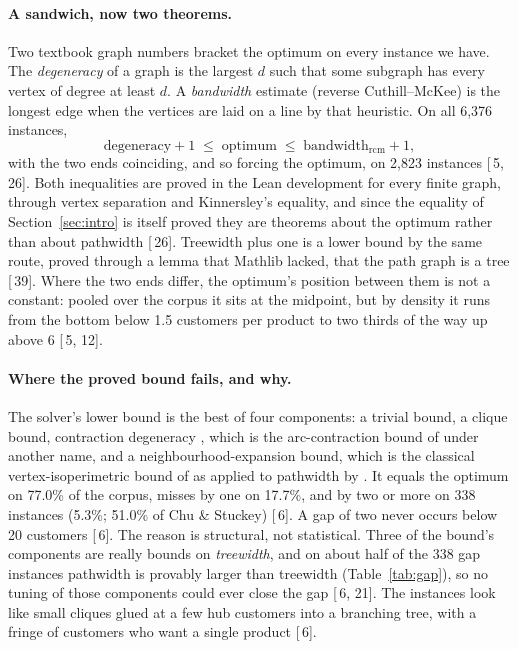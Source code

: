 \documentclass[11pt,a4paper]{article}
\renewcommand{\S}[1]{[\textsection\,#1]}
\begin{document}
\paragraph{A sandwich, now two theorems.}
Two textbook graph numbers bracket the optimum on every instance we have.
The \emph{degeneracy} of a graph is the largest $d$ such that some subgraph
has every vertex of degree at least $d$. A \emph{bandwidth} estimate
(reverse Cuthill--McKee) is the longest edge when the vertices are laid on a
line by that heuristic. On all 6,376 instances,
\[
\text{degeneracy} + 1 \;\le\; \text{optimum} \;\le\; \text{bandwidth}_{\mathrm{rcm}} + 1,
\]
with the two ends coinciding, and so forcing the optimum, on 2,823 instances
\S{5, 26}. Both inequalities are proved in the Lean development for every
finite graph, through vertex separation and Kinnersley's equality, and since
the equality of Section~\ref{sec:intro} is itself proved they are theorems
about the optimum rather than about pathwidth \S{26}. Treewidth plus one is
a lower bound by the same route, proved through a lemma that Mathlib lacked,
that the path graph is a tree \S{39}. Where the two ends differ, the
optimum's position between them is not a constant: pooled over the corpus it
sits at the midpoint, but by density it runs from the bottom below 1.5
customers per product to two thirds of the way up above 6 \S{5, 12}.

\paragraph{Where the proved bound fails, and why.}
The solver's lower bound is the best of four components: a trivial bound, a
clique bound, contraction degeneracy \citep{BKW2006}, which is the
arc-contraction bound of \citet{YBS1999} under another name, and a
neighbourhood-expansion bound, which is the classical vertex-isoperimetric
bound of \citet{Harper1966} as applied to pathwidth by
\citet{ChandranKavitha2006}. It equals the optimum on 77.0\% of the
corpus, misses by one on 17.7\%, and by two or more on 338 instances (5.3\%;
51.0\% of Chu \& Stuckey) \S{6}. A gap of two never occurs below 20
customers \S{6}. The reason is structural, not statistical. Three of the
bound's components are really bounds on \emph{treewidth}, and on about half
of the 338 gap instances pathwidth is provably larger than treewidth
(Table~\ref{tab:gap}), so no tuning of those components could ever close the
gap \S{6, 21}. The instances look like small cliques glued at a few hub
customers into a branching tree, with a fringe of customers who want a single
product \S{6}.
\end{document}
